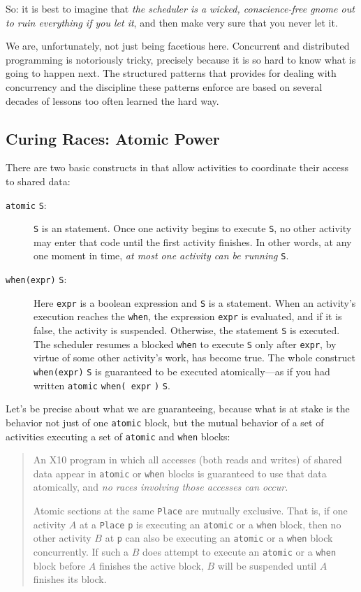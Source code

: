 So: it is
best to imagine that {\em the scheduler is a wicked, conscience-free gnome
out to ruin everything if you let it}, and then make very sure that you never let it.

We are, unfortunately, not just being facetious here. Concurrent and distributed
programming is notoriously tricky, precisely because it is so hard to know
what is going to happen next.  The structured patterns that \Xten{} provides for
dealing with concurrency and the discipline these patterns enforce are based 
on several decades of lessons too often learned the hard way.

\subsection{Curing Races: Atomic Power}\label{ssec:curingraces}

There are two basic constructs in \Xten{} that allow activities to 
coordinate their access to shared data:
\begin{description} 
\item[{\tt atomic} {\tt S}: ]
{\tt S} is an \Xten{} statement.
Once one activity begins to execute {\tt S}, no other activity may enter that
code until the first activity finishes.  In other words, at any one moment in
time, {\em at most one activity can be running} {\tt S}.
\item[{\tt when(expr)} {\tt S}:]
Here {\tt expr} is a boolean expression and {\tt S} is a statement.
When an activity's execution reaches the {\tt when}, 
the expression {\tt expr} is evaluated, and if it is false, the activity is suspended.  
Otherwise, the statement {\tt S} is executed.
The scheduler resumes a blocked {\tt when} to execute {\tt S}  only after
{\tt expr}, by virtue of some other activity's work, has become true.
The whole construct {\tt when(expr)} {\tt S} is guaranteed to be executed
atomically---as if you had written {\tt atomic} {\tt when( }{\tt expr} {\tt )} {\tt S}.
\end{description}

Let's be precise about what we are guaranteeing, because what is at stake
is the behavior not just of one {\tt atomic} block, but the mutual behavior of
a set of activities executing a set of {\tt atomic} and {\tt when} blocks:
\begin{quote}
   An X10 program in which all accesses (both reads and writes) of shared data 
appear in {\tt atomic} or {\tt when} blocks is guaranteed to use that
data atomically, and {\em no races involving those accesses can occur.}

Atomic sections at the same {\tt Place} are mutually exclusive. 
That is, if one activity $A$ at a {\tt Place} {\tt p} is executing
an {\tt atomic} or a {\tt when} block, then no other activity $B$ at {\tt p} can also be 
executing an {\tt atomic} or a {\tt when} block concurrently.
If such a $B$ does attempt
to execute an {\tt atomic} or a {\tt when} block before $A$ finishes the
active block, $B$ will be suspended until $A$ finishes its block. 
\end{quote}


